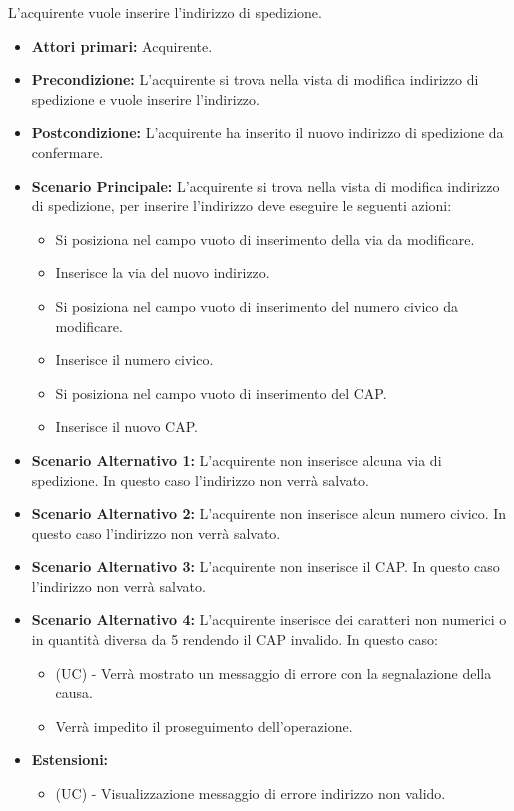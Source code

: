 L'acquirente vuole inserire l'indirizzo di spedizione.
\begin{itemize}
    \item \textbf{Attori primari:} Acquirente.
    \item \textbf{Precondizione:} L'acquirente si trova nella vista di modifica indirizzo di spedizione e vuole inserire l'indirizzo.
    \item \textbf{Postcondizione:} L'acquirente ha inserito il nuovo indirizzo di spedizione da confermare.
    \item \textbf{Scenario Principale:} L'acquirente si trova nella vista di modifica indirizzo di spedizione, per inserire l'indirizzo deve eseguire le seguenti azioni:
        \begin{itemize}
            \item Si posiziona nel campo vuoto di inserimento della via da modificare.
            \item Inserisce la via del nuovo indirizzo.
            \item Si posiziona nel campo vuoto di inserimento del numero civico da modificare.
            \item Inserisce il numero civico.
            \item Si posiziona nel campo vuoto di inserimento del CAP.
            \item Inserisce il nuovo CAP.
        \end{itemize}
    \item \textbf{Scenario Alternativo 1:} L'acquirente non inserisce alcuna via di spedizione. In questo caso l'indirizzo non verrà salvato.
    \item \textbf{Scenario Alternativo 2:} L'acquirente non inserisce alcun numero civico. In questo caso l'indirizzo non verrà salvato.
    \item \textbf{Scenario Alternativo 3:} L'acquirente non inserisce il CAP. In questo caso l'indirizzo non verrà salvato.
    \item \textbf{Scenario Alternativo 4:} L'acquirente inserisce dei caratteri non numerici o in quantità diversa da 5 rendendo il CAP invalido. In questo caso:
    \begin{itemize}
        \item (UC) - Verrà mostrato un messaggio di errore con la segnalazione della causa.
        \item Verrà impedito il proseguimento dell'operazione.
    \end{itemize}
    \item \textbf{Estensioni:}
    \begin{itemize}
        \item (UC) - Visualizzazione messaggio di errore  indirizzo non valido.
    \end{itemize}
\end{itemize}


